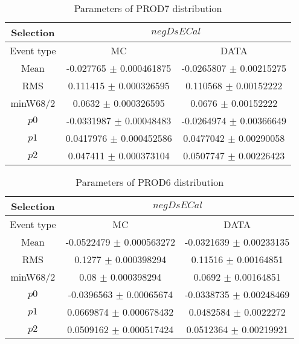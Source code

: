 \documentclass[a4paper,12pt]{article}
\begin{document}
\begin{table}[htbp]
\begin{center}
\begin{tabular}{|c|c|c|}
        \hline
        Selection & \multicolumn{2}{|c|}{$negDsECal$}  \\ \hline
        Event type & MC & DATA \\ 
        \hline
        Mean & -0.027765 $\pm$ 0.000461875 & -0.0265807 $\pm$ 0.00215275 \\ 
        \hline 
        RMS & 0.111415 $\pm$ 0.000326595 & 0.110568 $\pm$ 0.00152222 \\ 
        \hline 
        minW68/2 & 0.0632 $\pm$ 0.000326595 & 0.0676 $\pm$ 0.00152222 \\ 
        \hline 
        $p0$ & -0.0331987 $\pm$ 0.00048483 & -0.0264974 $\pm$ 0.00366649 \\ 
        \hline 
        $p1$ & 0.0417976 $\pm$ 0.000452586 & 0.0477042 $\pm$ 0.00290058 \\ 
        \hline 
        $p2$ & 0.047411 $\pm$ 0.000373104 & 0.0507747 $\pm$ 0.00226423 \\ 
        \hline 
\end{tabular}
\caption{Parameters of PROD7 distribution } \vspace{0.2in}
\label{xxx}
\end{center}
\end{table}
\begin{table}[htbp]
\begin{center}
\begin{tabular}{|c|c|c|}
        \hline
        Selection & \multicolumn{2}{|c|}{$negDsECal$}  \\ \hline
        Event type & MC & DATA \\ 
        \hline
        Mean & -0.0522479 $\pm$ 0.000563272 & -0.0321639 $\pm$ 0.00233135 \\ 
        \hline 
        RMS & 0.1277 $\pm$ 0.000398294 & 0.11516 $\pm$ 0.00164851 \\ 
        \hline 
        minW68/2 & 0.08 $\pm$ 0.000398294 & 0.0692 $\pm$ 0.00164851 \\ 
        \hline 
        $p0$ & -0.0396563 $\pm$ 0.00065674 & -0.0338735 $\pm$ 0.00248469 \\ 
        \hline 
        $p1$ & 0.0669874 $\pm$ 0.000678432 & 0.0482584 $\pm$ 0.0022272 \\ 
        \hline 
        $p2$ & 0.0509162 $\pm$ 0.000517424 & 0.0512364 $\pm$ 0.00219921 \\ 
        \hline 
\end{tabular}
\caption{Parameters of PROD6 distribution } \vspace{0.2in}
\label{xxx}
\end{center}
\end{table}
\end{document}

